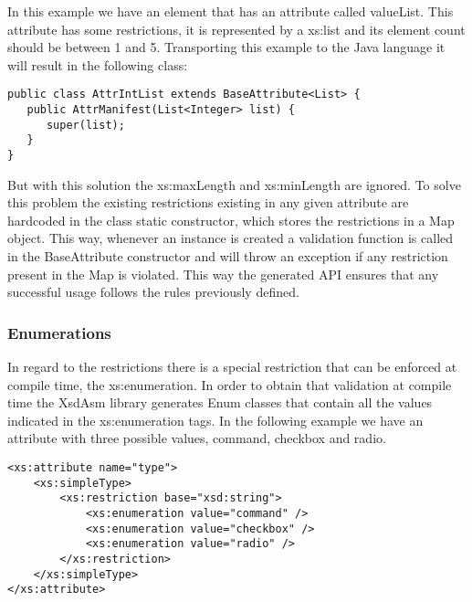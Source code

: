 \noindent
In this example we have an element that has an attribute called valueList. This attribute has some restrictions, it is represented by a xs:list and its element count should be between 1 and 5. Transporting this example to the Java language it will result in the following class:

\bigskip

\lstset{language=Java}

\begin{minipage}{\linewidth}
\begin{lstlisting}[caption={Attribute Class Example},captionpos=b]
public class AttrIntList extends BaseAttribute<List> {
   public AttrManifest(List<Integer> list) {
      super(list);
   }
}
\end{lstlisting}
\end{minipage}

\noindent
But with this solution the xs:maxLength and xs:minLength are ignored. To solve this problem the existing restrictions existing in any given attribute are hardcoded in the class static constructor, which stores the restrictions in a Map object. This way, whenever an instance is created a validation function is called in the BaseAttribute constructor and will throw an exception if any restriction present in the Map is violated. This way the generated \ac{API} ensures that any successful usage follows the rules previously defined.

\subsubsection{Enumerations}
\label{sec:enumarations}

In regard to the restrictions there is a special restriction that can be enforced at compile time, the xs:enumeration. In order to obtain that validation at compile time the XsdAsm library generates Enum classes that contain all the values indicated in the xs:enumeration tags. In the following example we have an attribute with three possible values, command, checkbox and radio.

\bigskip


\begin{minipage}{\linewidth}
\begin{lstlisting}[caption={Enumeration Definition},captionpos=b]
<xs:attribute name="type">
    <xs:simpleType>
        <xs:restriction base="xsd:string">
            <xs:enumeration value="command" />
            <xs:enumeration value="checkbox" />
            <xs:enumeration value="radio" />
        </xs:restriction>
    </xs:simpleType>
</xs:attribute>
\end{lstlisting}
\end{minipage}

